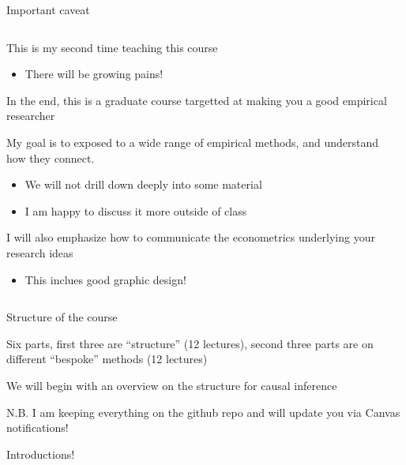 \documentclass[notes,11pt, aspectratio=169]{beamer}
\newenvironment{wideitemize}{\itemize\addtolength{\itemsep}{10pt}}{\enditemize}
\begin{document}
\begin{frame}{Important caveat}
\begin{columns}[T] %
\begin{column}{.7\textwidth}
  \begin{wideitemize}
  \item This is my second time teaching this course
    \begin{itemize}
    \item There will be growing pains!
    \end{itemize}
  \item In the end, this is a graduate course targetted at making you a good empirical researcher
  \item My goal is to exposed to a wide range of empirical methods,
    and understand how they connect.
    \begin{itemize}
    \item We will not drill down deeply into some material
    \item I am happy to discuss it more outside of class
    \end{itemize}
  \item I will also emphasize how to communicate the econometrics underlying your research ideas
    \begin{itemize}
    \item This inclues good graphic design!
    \end{itemize}
  \end{wideitemize}
\end{column}%
\hfill%
\begin{column}{.38\textwidth}
  \makebox[\linewidth][c]{
    \resizebox{\linewidth}{!}{
    }
  }
\end{column}%
\end{columns}
\end{frame}


\begin{frame}{Structure of the course}
  \begin{wideitemize}
  \item Six parts, first three are ``structure'' (12 lectures), second
    three parts are on different ``bespoke'' methods (12 lectures)
  \item We will begin with an overview on the structure for causal inference
  \item N.B. I am keeping everything on the github repo and will
    update you via Canvas notifications!
  \end{wideitemize}
\end{frame}


\begin{frame}{Introductions!}
\end{frame}
\end{document}
